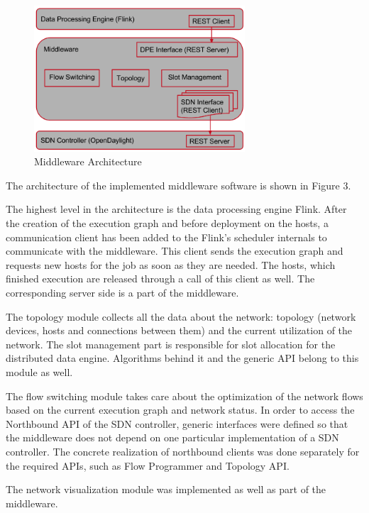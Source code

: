 \begin{figure}[h]
    \centering
    \includegraphics[width=0.7\textwidth]{graphics/architecture.png}
    \caption{Middleware Architecture}
    \label{fig:architecture}
\end{figure}

The architecture of the implemented middleware software is shown in Figure 3.

The highest level in the architecture is the data processing engine Flink. After the creation of the
execution graph and before deployment on the hosts, a communication client has been added to the
Flink's scheduler internals to communicate with the middleware. This client sends the execution
graph and requests new hosts for the job as soon as they are needed. The hosts, which finished
execution are released through a call of this client as well. The corresponding server side is a
part of the middleware.

The topology module collects all the data about the network: topology (network devices, hosts and
connections between them) and the current utilization of the network. The slot management part is
responsible for slot allocation for the distributed data engine. Algorithms behind it and the
generic API belong to this module as well.

The flow switching module takes care about the optimization of the network flows based on the
current execution graph and network status. In order to access the Northbound API of the SDN
controller, generic interfaces were defined so that the middleware does not depend on one particular
implementation of a SDN controller. The concrete realization of northbound clients was done
separately for the required APIs, such as Flow Programmer and Topology API.

The network visualization module was implemented as well as part of the middleware.

